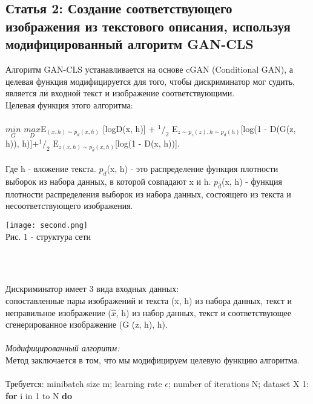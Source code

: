 \documentclass{article}
\begin{document}
    \newpage
    \begin{center} 
    \section{Статья 2: Создание соответствующего изображения из текстового описания, используя модифицированный алгоритм GAN-CLS}
    \end{center} 
    \large 
    Алгоритм GAN-CLS устанавливается на основе cGAN (Conditional GAN), а целевая функция модифицируется для того, чтобы дискриминатор мог судить, является ли входной текст и изображение соответствующими.\\
    Целевая функция этого алгоритма:\\ \\
    $\underset{G}{min}$ $\underset{D}{max}$E$_{(x,h) \sim p_{d}(x,h)}$ [logD(x, h)] + $^1/_2$ E$_{z \sim p_{z}(z),h \sim p_{d}(h)}$[log(1 - D(G(z, h)), h)]+$^1/_2$ E$_{z(x,h) \sim p_{\hat{d}}(x,h)}$[log(1 - D(x, h))].
    \\ \\
    Где h - вложение текста. $p_{d}$(x, h) - это распределение функция плотности выборок из набора данных, в которой совпадают x и h. $p_{\hat{d}}$(x, h) - функция плотности распределения выборок из набора данных, состоящего из текста и несоответствующего изображения.
    \\
    \begin{center} 
    \texttt{[image: second.png]}
    \\
    \caption{Рис. 1 - структура сети}
    \\ \\
    \end{center} 
    Дискриминатор имеет 3 вида входных данных:\\
    сопоставленные пары изображений и текста (x, h) из набора данных, текст и неправильное изображение ($\hat{x}$, h) из набор данных, текст и соответствующее сгенерированное изображение (G (z, h), h).
    \\ \\
    \textit{Модифицированный алгоритм:}\\
    Метод заключается в том, что мы модифицируем целевую функцию алгоритма.
    \\
    \\
    Требуется: minibatch size m; learning rate $\epsilon$; number of iterations N; dataset X
    1: \textbf {for} i in 1 to N \textbf {do}\\
\end{document}
